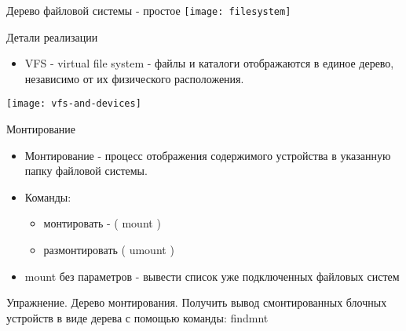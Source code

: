 \begin{frame}{Дерево файловой системы - простое}
\texttt{[image: filesystem]} 
\end{frame}

\begin{frame}{Детали реализации}
  \begin{itemize}
    \item \alert{VFS - virtual file system} - файлы и каталоги отображаются в единое дерево, независимо от их физического расположения.
  \end{itemize}
  \texttt{[image: vfs-and-devices]}
\end{frame}

\begin{frame}{Монтирование}
  \begin{itemize}
    \item \alert{Монтирование} - процесс отображения содержимого устройства в указанную папку файловой системы.
    \item Команды:
      \begin{itemize}
        \item монтировать - ( \alert{mount} ) 
        \item размонтировать ( \alert{umount} )
      \end{itemize}
    \item \alert{mount} без параметров - вывести список уже подключенных файловых систем
  \end{itemize}
      \begin{block}{Упражнение. Дерево монтирования.}
     Получить вывод смонтированных блочных устройств в виде дерева с помощью команды: \alert{findmnt}
      \end{block}
  
\end{frame}

